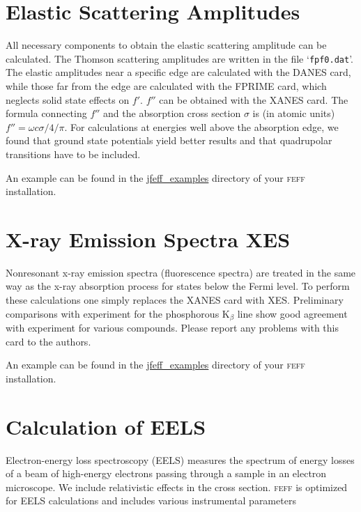 \documentclass[11pt,oneside]{report} %
\renewcommand{\htmlref}[2]{\hyperlink{#2}{#1}}
\newcommand{\program}[1]{\textsc{#1}}
\newcommand{\feff}{\program{feff}}
\newcommand{\file}[1]{`\texttt{#1}'}
\renewcommand{\htmlref}[2]{{#1}} %
\begin{document}

\section{Elastic Scattering Amplitudes}
\label{sec:DANES}
All necessary components to obtain the elastic scattering amplitude
can be calculated. The Thomson scattering
amplitudes are written in the file \file{fpf0.dat}. The elastic amplitudes
near a specific edge are calculated with the \htmlref{DANES}{card:dan} 
card, while those far from the edge are calculated with the 
\htmlref{FPRIME}{card:fpr} card, which neglects solid state effects on $f'$.
$f''$ can be obtained with the \htmlref{XANES}{card:xan} card. 
The formula connecting $f''$ and the absorption cross section $\sigma $ 
is (in atomic units) $f'' = \omega c \sigma /4/\pi $. For calculations 
at energies well above the absorption edge, we found that ground state 
potentials yield better results and that quadrupolar transitions 
have to be included.

An example can be found in the \url{jfeff_examples} directory of your {\feff} installation.



\section{X-ray Emission Spectra XES}
\label{sec:XES}
Nonresonant x-ray emission spectra (fluorescence spectra) 
are treated in the same way as the x-ray absorption process
for states below the Fermi level. To perform these calculations one simply
replaces the \htmlref{XANES}{card:xan} card with \htmlref{XES}{card:xes}. 
Preliminary comparisons with experiment
for the phosphorous K$_{\beta}$ line show good agreement with experiment for various
compounds. Please report any problems with this card to the authors.

An example can be found in the \url{jfeff_examples} directory of your {\feff} installation.



\section{Calculation of EELS}
\label{sec:EELS}
Electron-energy loss spectroscopy (EELS) measures the spectrum of 
energy losses of a beam of high-energy electrons passing through a 
sample in an electron microscope. We include relativistic effects in the cross 
section.  {\feff} is optimized for EELS calculations and includes various instrumental parameters
\end{document}
